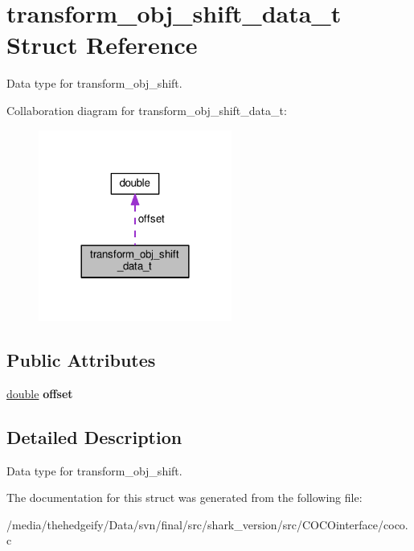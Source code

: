 \hypertarget{structtransform__obj__shift__data__t}{}\section{transform\+\_\+obj\+\_\+shift\+\_\+data\+\_\+t Struct Reference}
\label{structtransform__obj__shift__data__t}


Data type for transform\+\_\+obj\+\_\+shift.  




Collaboration diagram for transform\+\_\+obj\+\_\+shift\+\_\+data\+\_\+t\+:\nopagebreak
\begin{figure}[H]
\begin{center}
\leavevmode
\includegraphics[width=180pt]{structtransform__obj__shift__data__t__coll__graph}
\end{center}
\end{figure}
\subsection*{Public Attributes}
\begin{DoxyCompactItemize}
\item 
\hyperlink{classdouble}{double} {\bfseries offset}\hypertarget{structtransform__obj__shift__data__t_a15ce8d47077eddf7a7bfede529f2e5a2}{}\label{structtransform__obj__shift__data__t_a15ce8d47077eddf7a7bfede529f2e5a2}

\end{DoxyCompactItemize}


\subsection{Detailed Description}
Data type for transform\+\_\+obj\+\_\+shift. 

The documentation for this struct was generated from the following file\+:\begin{DoxyCompactItemize}
\item 
/media/thehedgeify/\+Data/svn/final/src/shark\+\_\+version/src/\+C\+O\+C\+Ointerface/coco.\+c\end{DoxyCompactItemize}
